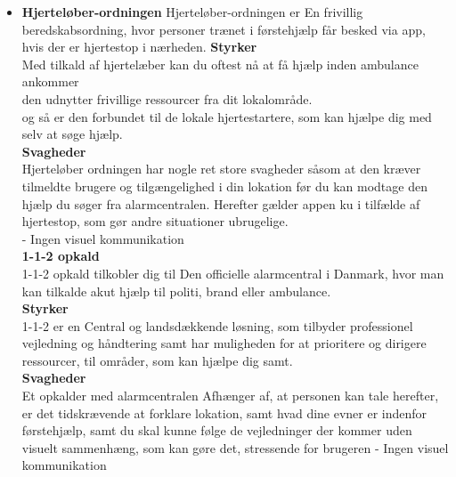 \begin{itemize}
    \item \textbf{Hjerteløber-ordningen}
    Hjerteløber-ordningen er En frivillig beredskabsordning, hvor personer trænet i førstehjælp får besked via app, hvis der er hjertestop i nærheden.
    \textbf{Styrker} \\
    Med tilkald af hjertelæber kan du oftest nå at få hjælp inden ambulance ankommer\\
    den udnytter frivillige ressourcer fra dit lokalområde. \\
    og så er den forbundet til de lokale hjertestartere, som kan hjælpe dig med selv at søge hjælp.\\
    \textbf{Svagheder} \\
    Hjerteløber ordningen har nogle ret store svagheder såsom at den kræver tilmeldte brugere og tilgængelighed i din lokation før du kan modtage den hjælp du søger fra alarmcentralen. Herefter gælder appen ku i tilfælde af hjertestop, som gør andre situationer ubrugelige.\\
    - Ingen visuel kommunikation\\
    \textbf{1-1-2 opkald}\\
    1-1-2 opkald tilkobler dig til Den officielle alarmcentral i Danmark, hvor man kan tilkalde akut hjælp til politi, brand eller ambulance.\\
    \textbf{Styrker} \\
    1-1-2 er en Central og landsdækkende løsning, som tilbyder professionel vejledning og håndtering samt har muligheden for at prioritere og dirigere ressourcer, til områder, som kan hjælpe dig samt.\\
    \textbf{Svagheder} \\
    Et opkalder med alarmcentralen Afhænger af, at personen kan tale herefter, er det tidskrævende at forklare lokation, samt hvad dine evner er indenfor førstehjælp, samt du skal kunne følge de vejledninger der kommer uden visuelt sammenhæng, som kan gøre det, stressende for brugeren
    - Ingen visuel kommunikation
\end{itemize}